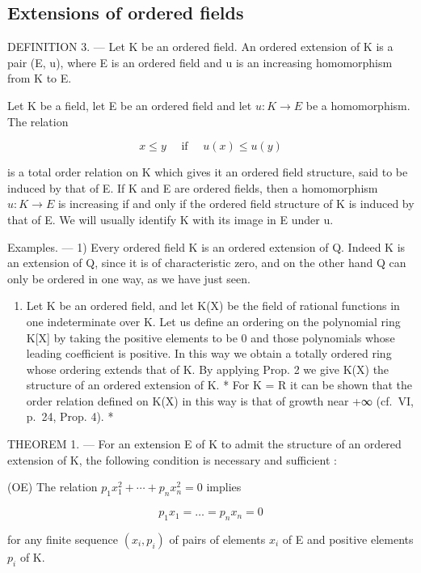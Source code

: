 \subsection{Extensions of ordered fields}

DEFINITION 3. --- Let K be an ordered field. An ordered extension of K is a pair (E, u), where E is an ordered field and u is an increasing homomorphism from K to E.

Let K be a field, let E be an ordered field and let \(u: K \rightarrow E\) be a homomorphism. The relation

\[
x \leqslant y \quad \text { if } \quad u (x) \leqslant u (y)
\]

is a total order relation on K which gives it an ordered field structure, said to be induced by that of E. If K and E are ordered fields, then a homomorphism \(u: K \rightarrow E\) is increasing if and only if the ordered field structure of K is induced by that of E. We will usually identify K with its image in E under u.

Examples. --- 1) Every ordered field K is an ordered extension of Q. Indeed K is an extension of Q, since it is of characteristic zero, and on the other hand Q can only be ordered in one way, as we have just seen.

\begin{enumerate}
\def\labelenumi{\arabic{enumi})}
\setcounter{enumi}{1}
\tightlist
\item
  Let K be an ordered field, and let K(X) be the field of rational functions in one indeterminate over K. Let us define an ordering on the polynomial ring K{[}X{]} by taking the positive elements to be 0 and those polynomials whose leading coefficient is positive. In this way we obtain a totally ordered ring whose ordering extends that of K. By applying Prop. 2 we give K(X) the structure of an ordered extension of K. * For K = R it can be shown that the order relation defined on K(X) in this way is that of growth near +∞ (cf.~VI, p.~24, Prop. 4). *
\end{enumerate}

THEOREM 1. --- For an extension E of K to admit the structure of an ordered extension of K, the following condition is necessary and sufficient :

(OE) The relation \(p_{1}x_{1}^{2} + \cdots + p_{n}x_{n}^{2} = 0\) implies

\[
p _ {1} x _ {1} = \dots = p _ {n} x _ {n} = 0
\]

for any finite sequence \((x_{i},p_{i})\) of pairs of elements \(x_{i}\) of E and positive elements \(p_i\) of K.

